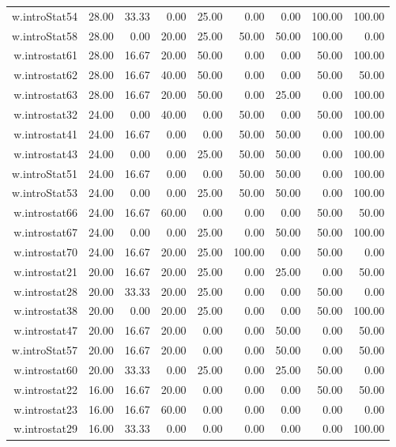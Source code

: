 \documentclass[12pt,english,nohyper]{tufte-handout}\usepackage[]{graphicx}\usepackage[]{color}
\begin{document}
\begin{longtable}{rrrrrrrrr}
  w.introStat54 & 28.00 & 33.33 & 0.00 & 25.00 & 0.00 & 0.00 & 100.00 & 100.00 \\ 
  w.introStat58 & 28.00 & 0.00 & 20.00 & 25.00 & 50.00 & 50.00 & 100.00 & 0.00 \\ 
  w.introstat61 & 28.00 & 16.67 & 20.00 & 50.00 & 0.00 & 0.00 & 50.00 & 100.00 \\ 
  w.introstat62 & 28.00 & 16.67 & 40.00 & 50.00 & 0.00 & 0.00 & 50.00 & 50.00 \\ 
  w.introstat63 & 28.00 & 16.67 & 20.00 & 50.00 & 0.00 & 25.00 & 0.00 & 100.00 \\ 
  w.introstat32 & 24.00 & 0.00 & 40.00 & 0.00 & 50.00 & 0.00 & 50.00 & 100.00 \\ 
  w.introstat41 & 24.00 & 16.67 & 0.00 & 0.00 & 50.00 & 50.00 & 0.00 & 100.00 \\ 
  w.introstat43 & 24.00 & 0.00 & 0.00 & 25.00 & 50.00 & 50.00 & 0.00 & 100.00 \\ 
  w.introStat51 & 24.00 & 16.67 & 0.00 & 0.00 & 50.00 & 50.00 & 0.00 & 100.00 \\ 
  w.introStat53 & 24.00 & 0.00 & 0.00 & 25.00 & 50.00 & 50.00 & 0.00 & 100.00 \\ 
  w.introstat66 & 24.00 & 16.67 & 60.00 & 0.00 & 0.00 & 0.00 & 50.00 & 50.00 \\ 
  w.introstat67 & 24.00 & 0.00 & 0.00 & 25.00 & 0.00 & 50.00 & 50.00 & 100.00 \\ 
  w.introstat70 & 24.00 & 16.67 & 20.00 & 25.00 & 100.00 & 0.00 & 50.00 & 0.00 \\ 
  w.introstat21 & 20.00 & 16.67 & 20.00 & 25.00 & 0.00 & 25.00 & 0.00 & 50.00 \\ 
  w.introstat28 & 20.00 & 33.33 & 20.00 & 25.00 & 0.00 & 0.00 & 50.00 & 0.00 \\ 
  w.introstat38 & 20.00 & 0.00 & 20.00 & 25.00 & 0.00 & 0.00 & 50.00 & 100.00 \\ 
  w.introstat47 & 20.00 & 16.67 & 20.00 & 0.00 & 0.00 & 50.00 & 0.00 & 50.00 \\ 
  w.introStat57 & 20.00 & 16.67 & 20.00 & 0.00 & 0.00 & 50.00 & 0.00 & 50.00 \\ 
  w.introstat60 & 20.00 & 33.33 & 0.00 & 25.00 & 0.00 & 25.00 & 50.00 & 0.00 \\ 
  w.introstat22 & 16.00 & 16.67 & 20.00 & 0.00 & 0.00 & 0.00 & 50.00 & 50.00 \\ 
  w.introstat23 & 16.00 & 16.67 & 60.00 & 0.00 & 0.00 & 0.00 & 0.00 & 0.00 \\ 
  w.introstat29 & 16.00 & 33.33 & 0.00 & 0.00 & 0.00 & 0.00 & 0.00 & 100.00 \\ 

\end{longtable}
\end{document}
